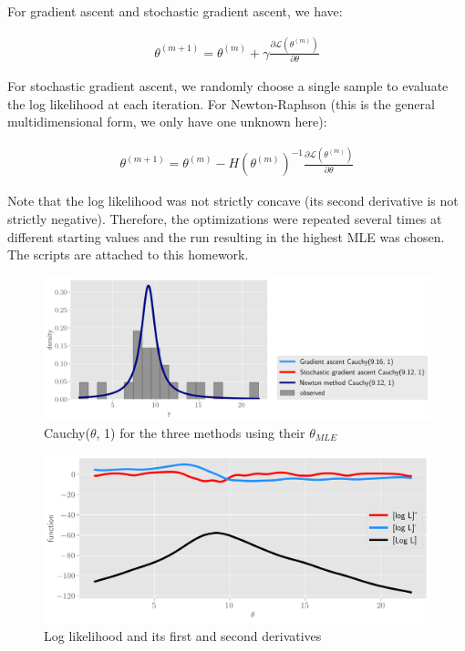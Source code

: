 \documentclass[11pt]{article}
\begin{document}
For gradient ascent and stochastic gradient ascent, we have:

\begin{align*}
    \theta^{(m+1)} = \theta^{(m)} + \gamma \frac{\partial \mathcal{L}(\theta^{(m)})}{\partial \theta}
\end{align*}

For stochastic gradient ascent, we randomly choose a single sample to evaluate the log likelihood at each iteration. For Newton-Raphson (this is the general multidimensional form, we only have one unknown here):

\begin{align*}
    \theta^{(m+1)} = \theta^{(m)} - H(\theta^{(m)})^{-1} \frac{\partial \mathcal{L}(\theta^{(m)})}{\partial \theta}
\end{align*}

Note that the log likelihood was not strictly concave (its second derivative is not strictly negative). Therefore, the optimizations were repeated several times at different starting values and the run resulting in the highest MLE was chosen. The scripts are attached to this homework.\\

\begin{figure}[!h]
    \centering
    \includegraphics[scale=.55]{homework_2/figures/mle_cauchy.png}
    \caption{Cauchy($\theta$, 1) for the three methods using their $\theta_{MLE}$}
    \label{fig:my_label}
\end{figure}

\begin{figure}[!h]
    \centering
    \includegraphics[scale=.55]{homework_2/figures/cauchy_fns.png}
    \caption{Log likelihood and its first and second derivatives}
    \label{fig:my_label}
\end{figure}
\end{document}
